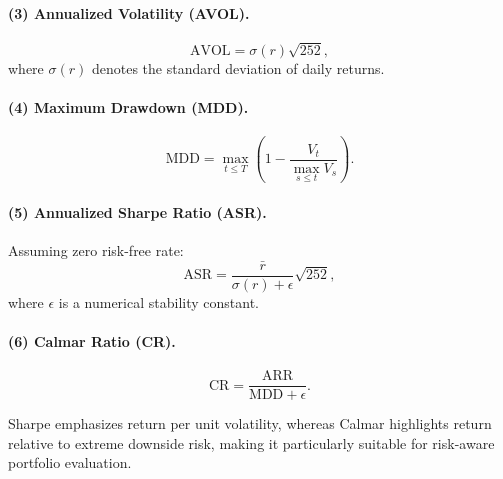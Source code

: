 \documentclass[letterpaper]{article} %
\begin{document}
\paragraph{(3) Annualized Volatility (AVOL).}
\begin{equation}
\text{AVOL} = \sigma(r)\sqrt{252},
\end{equation}
where $\sigma(r)$ denotes the standard deviation of daily returns.

\paragraph{(4) Maximum Drawdown (MDD).}
\begin{equation}
\text{MDD} = 
\max_{t \le T}
\left(
1 - \frac{V_t}{\max_{s \le t} V_s}
\right).
\end{equation}

\paragraph{(5) Annualized Sharpe Ratio (ASR).}
Assuming zero risk-free rate:
\begin{equation}
\text{ASR} = 
\frac{\bar r}{\sigma(r)+\epsilon}\sqrt{252},
\end{equation}
where $\epsilon$ is a numerical stability constant.

\paragraph{(6) Calmar Ratio (CR).}
\begin{equation}
\text{CR} = 
\frac{\text{ARR}}{\text{MDD}+\epsilon}.
\end{equation}

Sharpe emphasizes return per unit volatility, whereas Calmar highlights return relative to extreme downside risk, making it particularly suitable for risk-aware portfolio evaluation.
\end{document}

